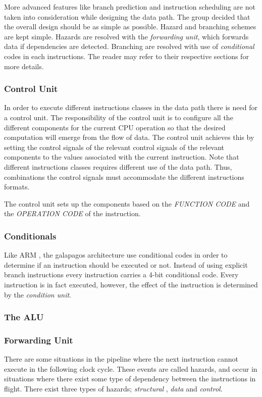 More advanced features like branch prediction and instruction scheduling are not taken into consideration while designing the data path. The group decided that the overall design should be as simple as possible. Hazard and branching schemes are kept simple. Hazards are resolved with the \emph{forwarding unit}, which forwards data if dependencies are detected. Branching are resolved with use of \emph{conditional} codes in each instructions. The reader may refer to their respective sections for more details.



\subsubsection{Control Unit} \label{fpga:fitness:sss:control_unit}
In order to execute different instructions classes in the data path there is need for a control unit. The responsibility of the control unit is to configure all the different components for the current CPU operation so that the desired computation will emerge from the flow of data. The control unit achieves this by setting the control signals of the relevant control signals of the relevant components to the values associated with the current instruction. Note that different instructions classes requires different use of the data path. Thus, combinations the control signals must accommodate the different instructions formats. 


The control unit sets up the components based on the \emph{FUNCTION CODE} and the \emph{OPERATION CODE} of the instruction.     



\subsubsection{Conditionals} \label{fpga:fitness:sss:conditionals}
Like ARM , the galapagos architecture use conditional codes in order to determine if an instruction should be executed or not. Instead of using explicit branch instructions every instruction carries a 4-bit conditional code. Every instruction is in fact executed, however, the effect of the instruction is determined by the \emph{condition unit}. 


\subsubsection{The ALU}\label{fpga:fitness:sss:the_alu}

\subsubsection{Forwarding Unit} \label{fpga:fitness:sss:forwarding_unit}
There are some situations in the pipeline where the next instruction cannot execute in the following clock cycle. These events are called hazards, and occur in situations where there exist some type of dependency between the instructions in flight. There exist three types of hazards; \emph{structural} , \emph{data} and \emph{control}. 


